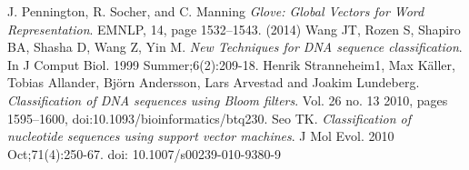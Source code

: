 \documentclass[oneside, twocolumn, a4paper, 10pt]{IEEEtran}
\begin{document}
%
\begin{thebibliography}{6}
 J. Pennington, R. Socher, and C. Manning \textit{Glove: Global Vectors for Word Representation}. EMNLP, 14, page 1532--1543. (2014)
 Wang JT, Rozen S, Shapiro BA, Shasha D, Wang Z, Yin M. \textit{New Techniques for DNA sequence classification}. In J Comput Biol. 1999 Summer;6(2):209-18.
 Henrik Stranneheim1, Max K\"{a}ller, Tobias Allander, Bj\"{o}rn Andersson, Lars Arvestad and Joakim Lundeberg. \textit{Classification of DNA sequences using Bloom filters}. Vol. 26 no. 13 2010, pages 1595–1600, doi:10.1093/bioinformatics/btq230.
 Seo TK. \textit{Classification of nucleotide sequences using support vector machines}. J Mol Evol. 2010 Oct;71(4):250-67. doi: 10.1007/s00239-010-9380-9

\end{thebibliography}
\end{document}
